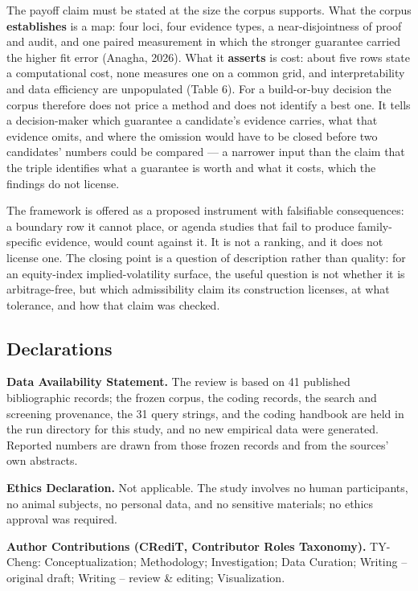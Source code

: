 \documentclass[11pt]{article}
\begin{document}
The payoff claim must be stated at the size the corpus supports. What the corpus \textbf{establishes} is a map: four loci, four evidence types, a near-disjointness of proof and audit, and one paired measurement in which the stronger guarantee carried the higher fit error (Anagha, 2026). What it \textbf{asserts} is cost: about five rows state a computational cost, none measures one on a common grid, and interpretability and data efficiency are unpopulated (Table 6). For a build-or-buy decision the corpus therefore does not price a method and does not identify a best one. It tells a decision-maker which guarantee a candidate's evidence carries, what that evidence omits, and where the omission would have to be closed before two candidates' numbers could be compared — a narrower input than the claim that the triple identifies what a guarantee is worth and what it costs, which the findings do not license.

The framework is offered as a proposed instrument with falsifiable consequences: a boundary row it cannot place, or agenda studies that fail to produce family-specific evidence, would count against it. It is not a ranking, and it does not license one. The closing point is a question of description rather than quality: for an equity-index implied-volatility surface, the useful question is not whether it is arbitrage-free, but which admissibility claim its construction licenses, at what tolerance, and how that claim was checked.

\subsection*{Declarations}
\textbf{Data Availability Statement.} The review is based on 41 published bibliographic records; the frozen corpus, the coding records, the search and screening provenance, the 31 query strings, and the coding handbook are held in the run directory for this study, and no new empirical data were generated. Reported numbers are drawn from those frozen records and from the sources' own abstracts.

\textbf{Ethics Declaration.} Not applicable. The study involves no human participants, no animal subjects, no personal data, and no sensitive materials; no ethics approval was required.

\textbf{Author Contributions (CRediT, Contributor Roles Taxonomy).} TY-Cheng: Conceptualization; Methodology; Investigation; Data Curation; Writing – original draft; Writing – review \& editing; Visualization.
\end{document}
